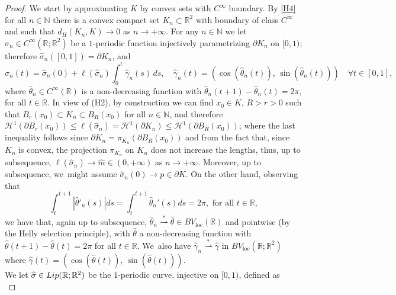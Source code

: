 \documentclass[11pt]{article}
\numberwithin{equation}{section}
\newcommand{\R}{\mathbb{R}}
\renewcommand\H{\mathcal H}
\let\len\ell
\newcommand{\weakstar}{\stackrel{*}{\rightharpoonup}}
\theoremstyle{definition}
\begin{document}
\begin{proof}
We start by approximating $K$ by convex sets with $C^\infty$ boundary. By \ref{H4} for all $n\in\mathbb{N}$ there is a convex compact set $K_n\subset\R^2$ with boundary of class $C^\infty$ and such that
$d_H(K_n,K)\to0$ as $n\to +\infty$.
For any $n\in\mathbb{N}$ we let $\widehat\sigma_n\in C^\infty(\mathbb R;\R^2)$ be a $1$\nobreakdash-periodic function injectively parametrizing $\partial K_n$ on $[0,1)$; therefore $\widehat\sigma_n([0,1])=\partial K_n$, and
\begin{equation*}
\widehat \sigma_n(t)=\widehat \sigma_n(0)+\len(\widehat\sigma_n)\int_0^t\widehat\gamma_n(s)\,ds,\quad \widehat\gamma_n(t)=(\cos(\widehat\theta_n(t)),\,\sin(\widehat\theta_n(t)))
\quad \forall t\in [0,1],
\end{equation*}
where $\widehat \theta_n\!\in\! C^\infty(\R)$ is a non-decreasing function with $\widehat\theta_n(t+1)-\widehat\theta_n(t)\!=\!2\pi$, for all \hbox{$t\!\in\! \mathbb R$}.
In view of (H2), by construction we can find $x_0\in K$, $R>r>0$ such that $B_r(x_0)\subset K_n\subset B_R(x_0)$ for all $n\in \mathbb N$, and therefore
$\mathcal{H}^1(\partial B_r(x_0))\le \len(\widehat\sigma_n)=
\H^1(\mathcal \partial K_n)\le\H^1(\partial B_R(x_0))$; where the last inequality follows since $\partial K_n=\pi_{K_n}(\partial B_R(x_0))$ and from the fact that, since $K_n$ is convex, the projection $\pi_{K_n}$ on $K_n$ does not increase the lengths, thus, up to subsequence, $\len(\widehat\sigma_n)\to \widehat m\in(0,+\infty)$ as $n\to +\infty$. Moreover, up to subsequence, we~might assume $\widehat\sigma_n(0)\to p\in \partial K$.
On the other hand, observing that
\begin{equation*}
\int_t^{t+1}|\widehat\theta'_n(s)|ds=\int_t^{t+1}\widehat\theta_n'(s)ds=2\pi, \text{ for all }t\in \mathbb R,
\end{equation*}
we have that, again up to subsequence, $\widehat\theta_n\weakstar\widehat\theta\in BV_{\mathrm{loc}}(\R)$ and pointwise (by the Helly selection principle), with $\widehat\theta$ a non-decreasing function with $\widehat \theta(t+1)-\widehat \theta(t)=2\pi$ for all $t\in \mathbb R$. We~also have $\widehat \gamma_n\weakstar\widehat \gamma$ in $BV_{\mathrm{loc}}(\mathbb R;\mathbb R^2)$ where $\widehat \gamma(t)=(\cos(\widehat \theta(t)),\,\sin(\widehat \theta(t)))$.\\
We let $\widehat \sigma\in {\rm{Lip}}(\R;\R^2)$ be the $1$-periodic curve, injective on $[0,1)$, defined as
\begin{equation}\label{sigma_boundary}

\end{equation}
\end{proof}
\end{document}
